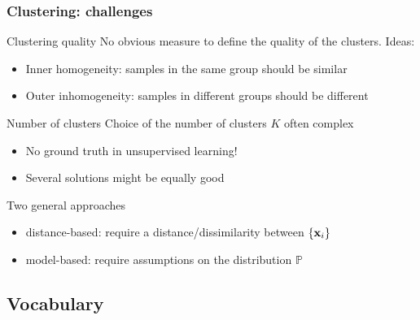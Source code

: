 \documentclass{beamer}\usepackage[]{graphicx}\usepackage[]{color}
\begin{document}
\begin{frame}[label=Clustering2]

  \frametitle{Clustering: challenges}

    \begin{block}{Clustering quality}
      No obvious measure to define the \alert{quality} of the clusters. Ideas:
      \begin{itemize}
        \item \alert{Inner} homogeneity: samples in the same group should be similar
        \item \alert{Outer} inhomogeneity: samples in different groups should be different
      \end{itemize}
    \end{block}

    \vspace{-.25cm}

    \begin{block}{Number of clusters}
      Choice of the number of clusters $K$ often complex
      \begin{itemize}
        \item No ground truth in unsupervised learning!
        \item Several solutions might be equally good
      \end{itemize}
    \end{block}

    \vspace{-.25cm}

    \begin{block}{Two general approaches}
      \vspace{-.25cm}
      \begin{itemize}
        \item \alert{distance-based}: require a distance/dissimilarity between $\{\mathbf{x}_i\}$
        \item \alert{model-based}: require assumptions on the distribution $\mathbb{P}$
      \end{itemize}
    \end{block}
    
\end{frame}

\subsection{Vocabulary}
\end{document}

